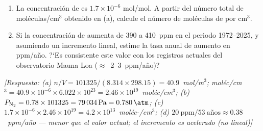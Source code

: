 \begin{bloque_ejercicios}
\begin{ejercicios}
\begin{enumerate}[label=\alph*)]
    \item La concentraci\'on de  es $1.7\times10^{-6}$
          mol/mol. A partir del n\'umero total de mol\'eculas/cm$^3$
          obtenido en (a), calcule el n\'umero de mol\'eculas de
           por cm$^3$.

    \item Si la concentraci\'on de  aumenta de 390 a
          410~ppm en el periodo 1972--2025, y asumiendo un
          incremento lineal, estime la tasa anual de aumento
          en ppm/a\~no. ?`Es consistente este valor con los
          registros actuales del observatorio Mauna Loa
          ($\approx$~2--3~ppm/a\~no)?
\end{enumerate}

\textit{[Respuesta:
(a) $n/V = 101325/(8.314\times298.15)
= 40.9$~mol/m$^3$;
mol\'ec/cm$^3 = 40.9\times10^{-6}\times6.022\times10^{23}
= 2.46\times10^{19}$~mol\'ec/cm$^3$;
(b) $P_{\ce{N2}} = 0.78\times101325
= \SI{79034}{\pascal} = \SI{0.780}{\atm}$;
(c) $1.7\times10^{-6}\times2.46\times10^{19}
= 4.2\times10^{13}$~mol\'ec-/cm$^3$;
(d) $20~\text{ppm}/53~\text{a\~nos}
\approx 0.38$~ppm/a\~no --- menor que el valor actual;
el incremento es acelerado (no lineal)]}

\end{ejercicios}

\end{bloque_ejercicios}
